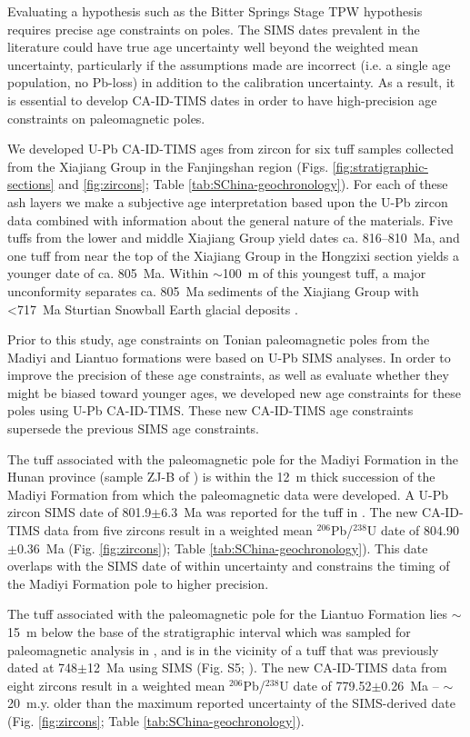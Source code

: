 Evaluating a hypothesis such as the Bitter Springs Stage TPW hypothesis requires precise age constraints on poles. The SIMS dates prevalent in the literature could have true age uncertainty well beyond the weighted mean uncertainty, particularly if the assumptions made are incorrect (i.e. a single age population, no Pb-loss) in addition to the calibration uncertainty. As a result, it is essential to develop CA-ID-TIMS dates in order to have high-precision age constraints on paleomagnetic poles.

We developed U-Pb CA-ID-TIMS ages from zircon for six tuff samples collected from the Xiajiang Group in the Fanjingshan region (Figs. \ref{fig:stratigraphic-sections} and \ref{fig:zircons}; Table \ref{tab:SChina-geochronology}). For each of these ash layers we make a subjective age interpretation based upon the U-Pb zircon data combined with information about the general nature of the materials. Five tuffs from the lower and middle Xiajiang Group yield dates ca. 816--810~Ma, and one tuff from near the top of the Xiajiang Group in the Hongzixi section yields a younger date of ca. 805~Ma. Within $\sim$100~m of this youngest tuff, a major unconformity separates ca. 805~Ma sediments of the Xiajiang Group with \textless717~Ma Sturtian Snowball Earth glacial deposits \citep{Bowring2007a, Macdonald2010a, MacLennan2018a, Lan2020a}.

Prior to this study, age constraints on Tonian paleomagnetic poles from the Madiyi and Liantuo formations were based on U-Pb SIMS analyses. In order to improve the precision of these age constraints, as well as evaluate whether they might be biased toward younger ages, we developed new age constraints for these poles using U-Pb CA-ID-TIMS. These new CA-ID-TIMS age constraints supersede the previous SIMS age constraints.

The tuff associated with the paleomagnetic pole for the Madiyi Formation in the Hunan province (sample ZJ-B of \citealp{Xian2020a}) is within the 12~m thick succession of the Madiyi Formation from which the paleomagnetic data were developed. A U-Pb zircon SIMS date of 801.9$\pm$6.3~Ma was reported for the tuff in \citet{Xian2020a}. The new CA-ID-TIMS data from five zircons result in a weighted mean $^{206}$Pb/$^{238}$U date of 804.90$\pm$0.36~Ma (Fig. \ref{fig:zircons}); Table \ref{tab:SChina-geochronology}). This date overlaps with the SIMS date of \citet{Xian2020a} within uncertainty and constrains the timing of the Madiyi Formation pole to higher precision.

The tuff associated with the paleomagnetic pole for the Liantuo Formation \citep{Evans2000a, Jing2015a} lies $\sim$15~m below the base of the stratigraphic interval which was sampled for paleomagnetic analysis in \citet{Evans2000a}, and is in the vicinity of a tuff that was previously dated at 748$\pm$12~Ma using SIMS (Fig. S5; \citealp{Ma1984a}). The new CA-ID-TIMS data from eight zircons result in a weighted mean $^{206}$Pb/$^{238}$U date of 779.52$\pm$0.26~Ma -- $\sim$20~m.y. older than the maximum reported uncertainty of the SIMS-derived date (Fig. \ref{fig:zircons}; Table \ref{tab:SChina-geochronology}).

